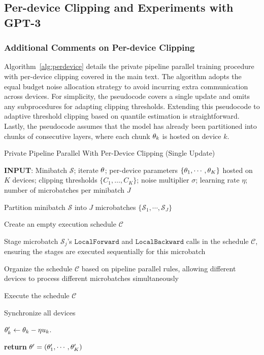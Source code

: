 \clearpage
\newpage
\subsection{Per-device Clipping and Experiments with GPT-3}\label{app:per_device_clipping}

\subsubsection{Additional Comments on Per-device Clipping}
Algorithm~\ref{alg:perdevice} details the private pipeline parallel training procedure with per-device clipping covered in the main text.
The algorithm adopts the equal budget noise allocation strategy to avoid incurring extra communication across devices.
For simplicity, the pseudocode covers a single update and omits any subprocedures for adapting clipping thresholds. 
Extending this pseudocode to adaptive threshold clipping based on quantile estimation is straightforward. 
Lastly, the pseudocode assumes that the model has already been partitioned into chunks of consecutive layers, where each chunk $\mathbf{\theta}_k$ is hosted on device $k$. 

\begin{algorithm}
\caption{Private Pipeline Parallel With Per-Device Clipping (Single Update)}
\label{alg:perdevice}
\begin{algorithmic}[1]

\State \textbf{INPUT}:  
Minibatch $\mathcal{S}$; 
iterate $\mathbf{\theta}$; 
per-device parameters $\{\mathbf{\theta}_1, \cdots, \mathbf{\theta}_K\}$ hosted on $K$ devices;  
clipping thresholds $\{C_1,\dots, C_K\}$; 
noise multiplier $\sigma$; 
learning rate $\eta$; 
number of microbatches per minibatch $J$

\State Partition minibatch $\mathcal{S}$ into $J$ microbatches $\{ \mathcal{S}_1, \cdots, \mathcal{S}_J \}$

\State Create an empty execution schedule $\mathcal{C}$ 


\State Stage microbatch $\mathcal{S}_j$'s $\texttt{LocalForward}$ and $\texttt{LocalBackward}$ calls in the schedule $\mathcal{C}$, ensuring the stages are executed sequentially for this microbatch
\EndFor

\State Organize the schedule $\mathcal{C}$ based on pipeline parallel rules, allowing different devices to process different microbatches simultaneously

\State Execute the schedule $\mathcal{C}$

\State Synchronize all devices

\State $\mathbf{\theta}_k' \gets \mathbf{\theta}_k -{\eta} u_k $.
\EndFor

\State \textbf{return} $\mathbf{\theta}' = (\mathbf{\theta}_1', \cdots, \mathbf{\theta}_K') $
\end{algorithmic}
\end{algorithm}



